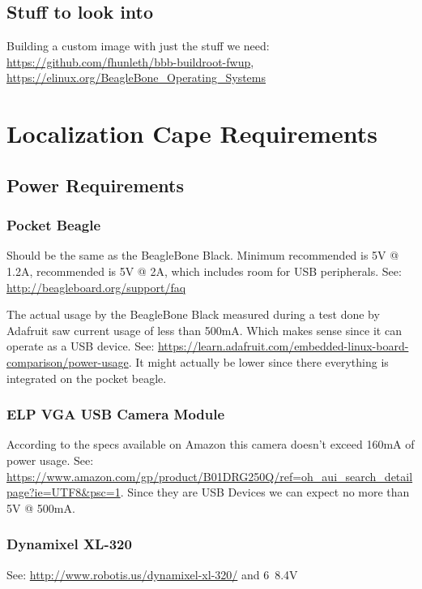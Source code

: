 \documentclass[]{book}
\begin{document}
\section{Stuff to look into}
Building a custom image with just the stuff we need: \url{https://github.com/fhunleth/bbb-buildroot-fwup}, \url{https://elinux.org/BeagleBone_Operating_Systems}

\chapter{Localization Cape Requirements}
\section{Power Requirements}
\subsection{Pocket Beagle}
Should be the same as the BeagleBone Black. Minimum recommended is 5V @ 1.2A, recommended is 5V @ 2A, which includes room for USB peripherals. See: \url{http://beagleboard.org/support/faq}

The actual usage by the BeagleBone Black measured during a test done by Adafruit saw current usage of less than 500mA. Which makes sense since it can operate as a USB device. See: \url{https://learn.adafruit.com/embedded-linux-board-comparison/power-usage}. It might actually be lower since there everything is integrated on the pocket beagle.

\subsection{ELP VGA USB Camera Module}
According to the specs available on Amazon this camera doesn't exceed 160mA of power usage. See: \url{https://www.amazon.com/gp/product/B01DRG250Q/ref=oh_aui_search_detailpage?ie=UTF8&psc=1}. Since they are USB Devices we can expect no more than 5V @ 500mA. 

\subsection{Dynamixel XL-320}
See: \url{http://www.robotis.us/dynamixel-xl-320/} and
6~8.4V
\end{document}
